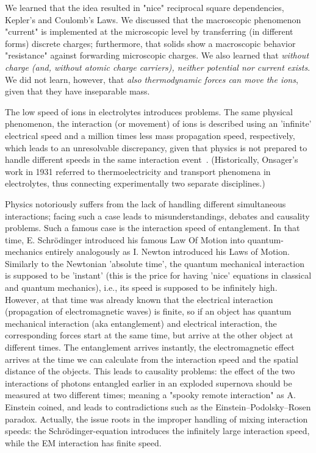 We learned that the idea resulted
in "nice" reciprocal square dependencies, Kepler's and Coulomb's
Laws. We discussed that the macroscopic phenomenon "current" is
implemented at the microscopic level by transferring (in different
forms) discrete charges; furthermore, that solids show a macroscopic
behavior "resistance" against forwarding microscopic charges. We also learned that \textit{without charge (and, without atomic charge carriers), neither potential nor current exists}. We did not learn, however,
that \textit{also thermodynamic forces can move the ions},
given that they have inseparable mass.


{
The low speed of ions in electrolytes introduces problems.
The same physical phenomenon,
the interaction (or movement) of ions is described using an 'infinite' electrical speed and 
a million times less mass propagation speed, respectively, which leads
to an unresolvable discrepancy, given that physics is not prepared to handle
different speeds in the same interaction event~\cite{VeghNon-ordinaryLaws:2025}.
(Historically, Onsager's work in 1931 referred to thermoelectricity and transport phenomena in electrolytes, thus connecting experimentally two separate disciplines.)

Physics notoriously suffers from the lack of handling
\hypertarget{MixingSpeeds}{different simultaneous interactions}; facing such a case leads to misunderstandings, debates and causality problems.
Such a famous case is the interaction speed of entanglement.
In that time, E. Schrödinger introduced his famous Law Of Motion into quantum-mechanics entirely analogously
as I. Newton introduced his Laws of Motion.
Similarly to the Newtonian 'absolute time', the quantum mechanical interaction is supposed to be 'instant'
(this is the price for having 'nice' equations in classical and quantum mechanics),
i.e., its speed is supposed to be infinitely high.
However, at that time was already known that the electrical interaction (propagation of electromagnetic waves) is finite,
so if an object has quantum mechanical interaction (aka entanglement) 
and electrical interaction, the corresponding forces start at the same time, but arrive at the other object at different times.
The entanglement arrives instantly, the electromagnetic effect arrives at the time we can calculate from the interaction speed and the spatial distance of the objects.
This leads to causality problems: the effect of the two interactions of photons entangled earlier in an exploded supernova should be measured at two different times; meaning a "spooky remote interaction" as A. Einstein coined,
and leads to contradictions such as the Einstein–Podolsky–Rosen paradox.
Actually, the issue roots in the improper handling of mixing interaction speeds:
the Schrödinger-equation introduces the infinitely large interaction speed,
while the
\gls{EM}
interaction has finite speed.
}

